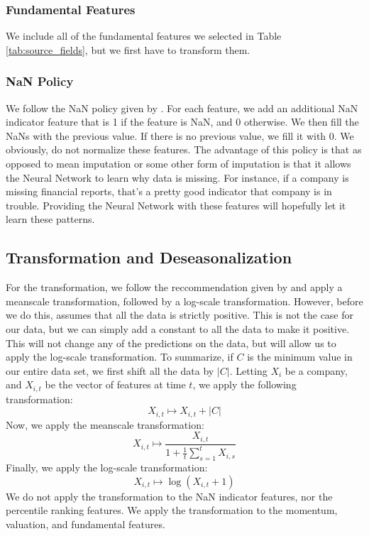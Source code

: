 \documentclass[AER]{AEA}
\begin{document}
\subsubsection{Fundamental Features}
We include all of the fundamental features we selected in Table \ref{tab:source_fields}, but we first have to transform them.
\subsubsection{NaN Policy}
We follow the NaN policy given by \cite{nanpolicy}. For each feature, we add an additional NaN indicator feature that is 1 if the feature is NaN, and 0 otherwise.
We then fill the NaNs with the previous value. If there is no previous value, we fill it with 0.
We obviously, do not normalize these features.
The advantage of this policy is that as opposed to mean imputation or some other form of imputation is that it 
allows the Neural Network to learn why data is missing. For instance, if a company is missing financial reports,
that's a pretty good indicator that company is in trouble. Providing the Neural Network with these features
will hopefully let it learn these patterns.
\subsection{Transformation and Deseasonalization}
For the transformation, we follow the reccommendation given by \cite{meanscale} and apply a meanscale transformation, followed by a log-scale transformation.
However, before we do this, \cite{meanscale} assumes that all the data is strictly positive. 
This is not the case for our data, but we can simply add a constant to all the data to make it positive.
This will not change any of the predictions on the data, but will allow us to apply the log-scale transformation.
To summarize, if $C$ is the minimum value in our entire data set, we first shift all the data by $|C|$. 
Letting $X_{i}$ be a company, and $X_{i,t}$ be the vector of features at time $t$, we apply the following transformation:
\[
X_{i,t} \mapsto X_{i,t} + |C|
\]
Now, we apply the meanscale transformation:
\[
X_{i,t} \mapsto \frac{X_{i,t}}{1 + \frac{1}{t}\sum_{s=1}^{t} X_{i,s}}
\]
Finally, we apply the log-scale transformation:
\[
X_{i,t} \mapsto \log(X_{i,t} + 1)
\]
We do not apply the transformation to the NaN indicator features, nor the percentile ranking features.
We apply the transformation to the momentum, valuation, and fundamental features.
\end{document}

